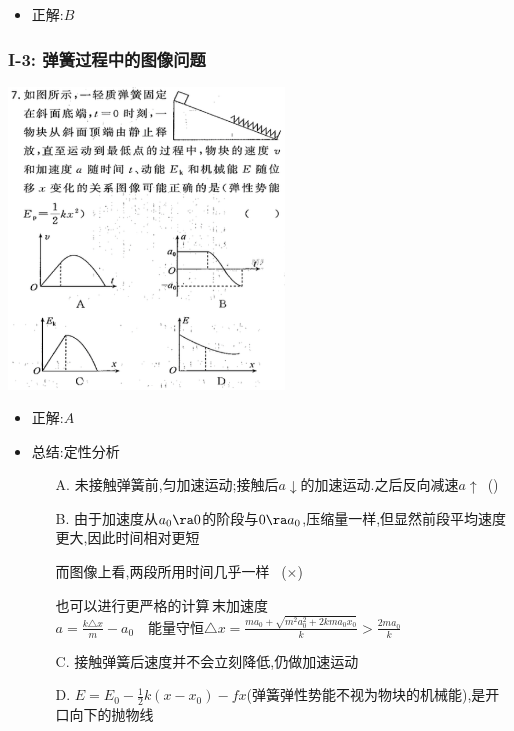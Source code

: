 \documentclass{article}
\begin{document}
\begin{itemize}
    \item 正解:\quad $B$
\end{itemize}

\vspace{2em}

\subsubsection{I-3: 弹簧过程中的图像问题}
\includegraphics[width=0.55\textwidth,keepaspectratio]{./pictures/3.12-3.png}

\begin{itemize}
    \item 正解:\quad $A$
    \item 总结:\quad 定性分析
    
    \begin{minipage}{0.88\textwidth}
        \begin{enumerate}
            \item[A.] 未接触弹簧前,匀加速运动;接触后$a \downarrow$的加速运动.之后反向减速$a \uparrow \,$ (\checkmark)
            \item[B.] 由于加速度从$a_{0} \ra 0$的阶段与$0 \ra a_{0}$,压缩量一样,但显然前段平均速度更大,因此时间相对更短
            
            而图像上看,两段所用时间几乎一样 \, ($\times$)

            也可以进行更严格的计算\,末加速度$a = \frac{k \triangle x }{m} - a_{0} \quad \text{能量守恒} \triangle x = \frac{ma_{0} + \sqrt{m^{2}a_{0}^{2} + 2kma_{0}x_{0}}}{k} > \frac{2ma_{0}}{k}$

            \item[C.] 接触弹簧后速度并不会立刻降低,仍做加速运动
            \item[D.] $E = E_{0} - \frac{1}{2} k (x-x_{0}) - fx$(弹簧弹性势能不视为物块的机械能),是开口向下的抛物线 
        \end{enumerate}
        
    \end{minipage}
\end{itemize}
\end{document}
